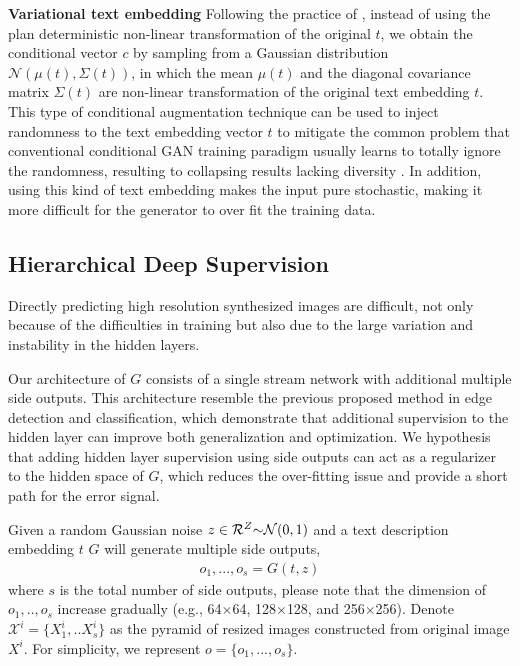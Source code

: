 \documentclass[10pt,twocolumn,letterpaper]{article}
\begin{document}
\textbf{Variational text embedding } Following the practice of \cite{han2017stackgan}, instead of using the plan deterministic non-linear transformation of the original $t$, we obtain the conditional vector $c$ by sampling from a Gaussian distribution $\mathcal{N}(\mu(t), \Sigma(t) )$, in which the mean $\mu(t)$ and the diagonal covariance matrix $\Sigma(t)$ are non-linear transformation of the original text embedding $t$. This type of conditional augmentation technique can be used to inject randomness to the text embedding vector $t$ to mitigate the common problem that conventional conditional GAN training paradigm usually learns to totally ignore the randomness, resulting to collapsing results lacking diversity \cite{reed2016generative}. In addition, using this kind of text embedding makes the input pure stochastic, making it more difficult for the generator to over fit the training data.

\subsection{Hierarchical Deep Supervision}
Directly predicting high resolution synthesized images are difficult, not only because of the difficulties in training but also due to the large variation and instability in the hidden layers.

Our architecture of $G$ consists of a single stream network with additional multiple side outputs. This architecture resemble the previous proposed method in edge detection\cite{xie2015holistically} and classification\cite{lee2015deeply}, which demonstrate that additional supervision to the hidden layer can improve both generalization and optimization.  We hypothesis that adding hidden layer supervision using side outputs can act as a regularizer to the hidden space of $G$, which reduces the over-fitting issue and provide a short path for the error signal.

Given a random Gaussian noise  $z\in \mathcal{R}^{Z} \scriptsize{\sim} \mathcal{N}(0,1)$ and a text description embedding $t$  $G$ will generate multiple side outputs,
\begin{equation}
\label{side}
\begin{split}
	o_1,...,o_s = G(t, z)	   
\end{split}
\end{equation}
where $s$ is the total number of side outputs, please note that the dimension of $o_1,..,o_s$ increase gradually (e.g., 64$\times$64, 128$\times$128, and 256$\times$256). Denote $\mathcal{X}^i = \{X^i_1, .. X^i_s\}$ as the pyramid of  resized images constructed from original image $X^i$.  For simplicity, we represent $o=\{o_1,...,o_s\}$.
\end{document}
